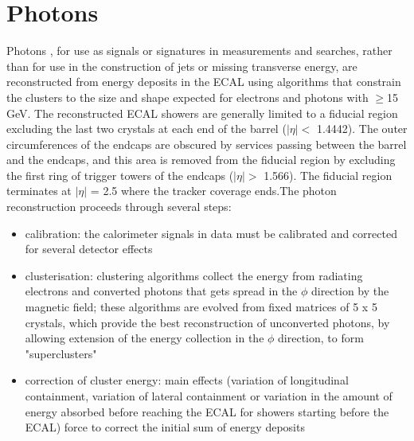 \section{Photons}
Photons \cite{photons}, for use as signals or signatures in measurements and searches, rather than for use in the construction of jets or missing transverse energy, are reconstructed from energy deposits in the ECAL using algorithms that constrain the clusters to the size and shape expected for electrons and photons with \pt  $\ge$15 GeV. The reconstructed ECAL showers are generally limited to a fiducial region excluding the last two crystals at each end of the barrel ($|\eta | <$ 1.4442). The outer circumferences of the endcaps are obscured by services passing between the barrel and the endcaps, and this area is removed from the fiducial region by excluding the first ring of trigger towers of the endcaps ($|\eta | >$ 1.566). The fiducial region terminates at $|\eta|$ = 2.5 where the tracker coverage ends.The photon reconstruction proceeds through several steps: 
\begin{itemize}
\item calibration: the calorimeter signals in data must be calibrated and corrected for several detector effects
\item clusterisation: clustering algorithms collect the energy from radiating electrons and converted photons that gets spread in the $\phi$ direction by the magnetic field; these algorithms are evolved from fixed matrices of 5 x 5 crystals, which provide the best reconstruction of unconverted photons, by allowing extension of the energy collection in the $\phi$ direction, to form "superclusters"
\item correction of cluster energy: main effects (\eg variation of longitudinal containment, variation of lateral containment or variation in the amount of energy absorbed before reaching the ECAL for showers starting before the ECAL) force to correct the initial sum of energy deposits
\end{itemize}

